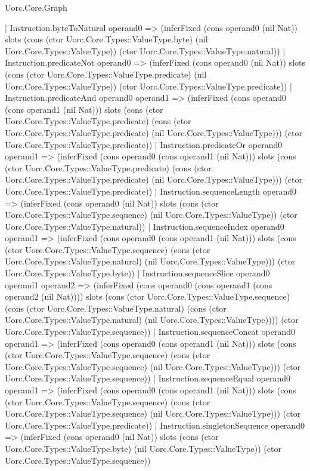 \begin{lexlean}{Uorc.Core.Graph}
\begin{semanticmodule}
{    | Instruction.byteToNatural operand0 => (inferFixed (cons operand0 (nil Nat)) slots (cons (ctor Uorc.Core.Types::ValueType.byte) (nil Uorc.Core.Types::ValueType)) (ctor Uorc.Core.Types::ValueType.natural))
    | Instruction.predicateNot operand0 => (inferFixed (cons operand0 (nil Nat)) slots (cons (ctor Uorc.Core.Types::ValueType.predicate) (nil Uorc.Core.Types::ValueType)) (ctor Uorc.Core.Types::ValueType.predicate))
    | Instruction.predicateAnd operand0 operand1 => (inferFixed (cons operand0 (cons operand1 (nil Nat))) slots (cons (ctor Uorc.Core.Types::ValueType.predicate) (cons (ctor Uorc.Core.Types::ValueType.predicate) (nil Uorc.Core.Types::ValueType))) (ctor Uorc.Core.Types::ValueType.predicate))
    | Instruction.predicateOr operand0 operand1 => (inferFixed (cons operand0 (cons operand1 (nil Nat))) slots (cons (ctor Uorc.Core.Types::ValueType.predicate) (cons (ctor Uorc.Core.Types::ValueType.predicate) (nil Uorc.Core.Types::ValueType))) (ctor Uorc.Core.Types::ValueType.predicate))
    | Instruction.sequenceLength operand0 => (inferFixed (cons operand0 (nil Nat)) slots (cons (ctor Uorc.Core.Types::ValueType.sequence) (nil Uorc.Core.Types::ValueType)) (ctor Uorc.Core.Types::ValueType.natural))
    | Instruction.sequenceIndex operand0 operand1 => (inferFixed (cons operand0 (cons operand1 (nil Nat))) slots (cons (ctor Uorc.Core.Types::ValueType.sequence) (cons (ctor Uorc.Core.Types::ValueType.natural) (nil Uorc.Core.Types::ValueType))) (ctor Uorc.Core.Types::ValueType.byte))
    | Instruction.sequenceSlice operand0 operand1 operand2 => (inferFixed (cons operand0 (cons operand1 (cons operand2 (nil Nat)))) slots (cons (ctor Uorc.Core.Types::ValueType.sequence) (cons (ctor Uorc.Core.Types::ValueType.natural) (cons (ctor Uorc.Core.Types::ValueType.natural) (nil Uorc.Core.Types::ValueType)))) (ctor Uorc.Core.Types::ValueType.sequence))
    | Instruction.sequenceConcat operand0 operand1 => (inferFixed (cons operand0 (cons operand1 (nil Nat))) slots (cons (ctor Uorc.Core.Types::ValueType.sequence) (cons (ctor Uorc.Core.Types::ValueType.sequence) (nil Uorc.Core.Types::ValueType))) (ctor Uorc.Core.Types::ValueType.sequence))
    | Instruction.sequenceEqual operand0 operand1 => (inferFixed (cons operand0 (cons operand1 (nil Nat))) slots (cons (ctor Uorc.Core.Types::ValueType.sequence) (cons (ctor Uorc.Core.Types::ValueType.sequence) (nil Uorc.Core.Types::ValueType))) (ctor Uorc.Core.Types::ValueType.predicate))
    | Instruction.singletonSequence operand0 => (inferFixed (cons operand0 (nil Nat)) slots (cons (ctor Uorc.Core.Types::ValueType.byte) (nil Uorc.Core.Types::ValueType)) (ctor Uorc.Core.Types::ValueType.sequence))
}
\end{semanticmodule}
\end{lexlean}
